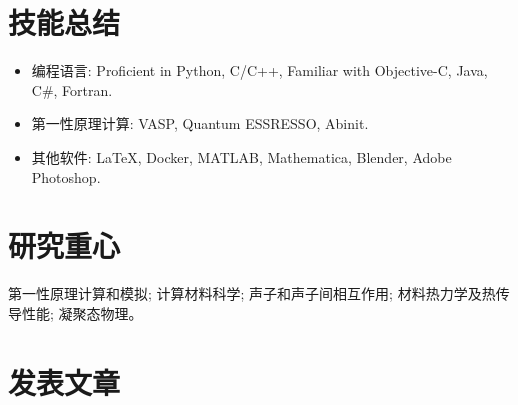 \documentclass[
  a4paper,
  12pt
]{cv}
\begin{document}
\section{技能总结}
\begin{itemize}
\item
编程语言:   
Proficient in
Python, C/C++, 
Familiar with Objective-C, Java, C\#, Fortran.
\item
第一性原理计算: 
VASP, Quantum ESSRESSO, Abinit.
\item
其他软件:    
{\LaTeX}, 
Docker,
MATLAB, 
Mathematica, 
Blender,
Adobe Photoshop.
\end{itemize}


\section{研究重心}
第一性原理计算和模拟;
计算材料科学;
声子和声子间相互作用;
材料热力学及热传导性能; 
凝聚态物理。


\section{发表文章}
\end{document}
